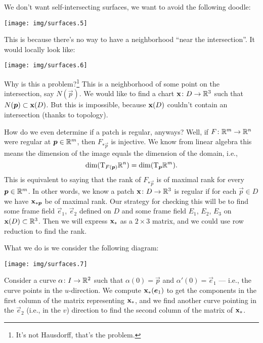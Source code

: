 \medbreak
\begin{remark}
We don't want self-intersecting surfaces, we want to avoid the following
doodle:
\begin{center}
\texttt{[image: img/surfaces.5]}
\end{center}
This is because there's no way to have a neighborhood ``near the
intersection''. It would locally look like:
\begin{center}
\texttt{[image: img/surfaces.6]}
\end{center}
Why is this a problem?\footnote{It's not Hausdorff, that's the problem.} This is a neighborhood of some point on the
intersection, say $N(\vec{p})$. We would like to find a chart
$\mathbf{x}\colon D\to\mathbb{R}^{3}$ such that $N(\boldsymbol{p})\subset\mathbf{x}(D)$.
But this is impossible, because $\mathbf{x}(D)$ couldn't contain an
intersection (thanks to topology).
\end{remark}

How do we even determine if a patch is regular, anyways?
Well, if $F\colon\mathbb{R}^{m}\to\mathbb{R}^{n}$ were regular at $\boldsymbol{p}\in\mathbb{R}^{m}$,
then $F_{*\vec{p}}$ is injective. We know from linear algebra this means
the dimension of the image equals the dimension of the domain, i.e.,
\begin{equation}
\dim(\mathrm{T}_{F(\boldsymbol{p})}\mathbb{R}^{n})=\dim(\mathrm{T}_{\boldsymbol{p}}\mathbb{R}^{m}).
\end{equation}
This is equivalent to saying that the rank of $F_{*\vec{p}}$ is of
maximal rank for every $\boldsymbol{p}\in\mathbb{R}^{m}$.
In other words, we know a patch $\mathbf{x}\colon D\to\mathbb{R}^{3}$ is regular
if for each $\vec{p}\in D$ we have $\mathbf{x}_{*\boldsymbol{p}}$ be of maximal
rank. Our strategy for checking this will be to find some frame field
$\vec{e}_{1}$, $\vec{e}_{2}$ defined on $D$ and some frame field
$E_{1}$, $E_{2}$, $E_{3}$ on $\mathbf{x}(D)\subset\mathbb{R}^{3}$. Then we will
express $\mathbf{x}_{*}$ as a $2\times3$ matrix, and we could use row
reduction to find the rank.

What we do is we consider the following diagram:
\begin{center}
  \texttt{[image: img/surfaces.7]}
\end{center}
Consider a curve $\alpha\colon I\to\mathbb{R}^{2}$ such that
$\alpha(0)=\vec{p}$ and $\alpha'(0)=\vec{e}_{1}$ --- i.e., the curve
points in the $u$-direction. We compute
$\mathbf{x}_{*}(\boldsymbol{e}_{1})$ to get the components in the first column of
the matrix representing $\mathbf{x}_{*}$, and we find another curve
pointing in the $\vec{e}_{2}$ (i.e., in the $v$) direction to find the
second column of the matrix of $\mathbf{x}_{*}$.

